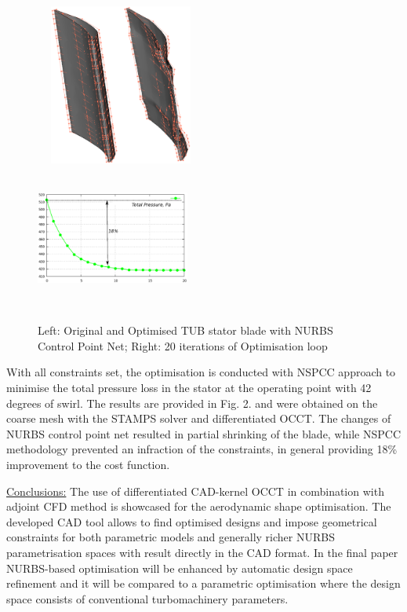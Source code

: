 \documentclass{article}
\begin{document}
\begin{figure}[t!]
  \centering
    \includegraphics[width=0.5\textwidth, height=200px]{images/blades}
    ~~~
    \includegraphics[width=0.45\textwidth, height = 180px]{images/costFunction}
	\caption{Left: Original and Optimised TUB stator blade with NURBS Control Point Net; Right: 20 iterations of Optimisation loop}
    \label{fullmodel}
\end{figure}



With all constraints set, the optimisation is conducted with NSPCC approach to minimise the total pressure loss in the stator at the operating point with 42 degrees of swirl. The results are provided in Fig. 2. and were obtained on the coarse mesh with the STAMPS solver and differentiated OCCT. The changes of NURBS control point net resulted in partial shrinking of the blade, while NSPCC methodology prevented an infraction of the constraints, in general providing 18\% improvement to the cost function.   


\vspace{1em}
\noindent\underline{Conclusions:}\vspace{0.2em}\newline
The use of differentiated CAD-kernel OCCT in combination with adjoint CFD method is showcased for the aerodynamic shape optimisation. The developed CAD tool allows to find optimised designs  and impose geometrical constraints for both parametric models and generally richer NURBS parametrisation spaces with result directly in the CAD format. In the final paper NURBS-based optimisation will be enhanced by automatic design space refinement and it will be compared to a parametric optimisation where the design space consists of conventional turbomachinery parameters.
\end{document}
